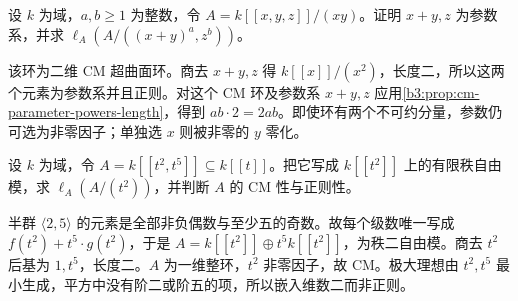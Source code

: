 \begin{exercise}\label{b3:ex:19-plane-crossing-parameter}
	设 \(k\) 为域，\(a,b\ge1\) 为整数，令 \(A=k[\![x,y,z]\!]/(xy)\)。证明 \(x+y,z\) 为参数系，并求 \(\ell_A(A/((x+y)^a,z^b))\)。
\end{exercise}
\begin{solution}
	该环为二维 CM 超曲面环。商去 \(x+y,z\) 得 \(k[\![x]\!]/(x^2)\)，长度二，所以这两个元素为参数系并且正则。对这个 CM 环及参数系 \(x+y,z\) 应用\cref{b3:prop:cm-parameter-powers-length}，得到 \(ab\cdot2=2ab\)。即使环有两个不可约分量，参数仍可选为非零因子；单独选 \(x\) 则被非零的 \(y\) 零化。
\end{solution}

\begin{exercise}\label{b3:ex:19-semigroup-parameter-free}
	设 \(k\) 为域，令 \(A=k[\![t^2,t^5]\!]\subseteq k[\![t]\!]\)。把它写成 \(k[\![t^2]\!]\) 上的有限秩自由模，求 \(\ell_A(A/(t^2))\)，并判断 \(A\) 的 CM 性与正则性。
\end{exercise}
\begin{solution}
	半群 \(\langle2,5\rangle\) 的元素是全部非负偶数与至少五的奇数。故每个级数唯一写成 \(f(t^2)+t^5\cdot g(t^2)\)，于是 \(A=k[\![t^2]\!]\oplus t^5k[\![t^2]\!]\)，为秩二自由模。商去 \(t^2\) 后基为 \(1,t^5\)，长度二。\(A\) 为一维整环，\(t^2\) 非零因子，故 CM。极大理想由 \(t^2,t^5\) 最小生成，平方中没有阶二或阶五的项，所以嵌入维数二而非正则。
\end{solution}
